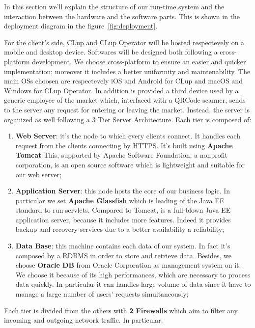 In this section we'll explain the structure of our run-time system and the interaction between the hardware and the software parts. This is shown in the deployment diagram in the figure~\ref{fig:deployment}. 

For the client's side, CLup and CLup Operator will be hosted respectevely on a mobile and desktop device. Softwares will be designed both following a cross-platform development. 
We choose cross-platform to ensure an easier and quicker implementation; moreover it includes a better uniformity and maintenability.   
The main OSs choosen are respectevely iOS and Android for CLup and macOS and Windows for CLup Operator.
In addition is provided a third device used by a generic employee of the market which, interfaced with a QRCode scanner, sends to the server any request for entering or leaving  the market.
Instead, the server is organized as well following a 3 Tier Server Architecture. Each tier is composed of:

\begin{enumerate}
\item \textbf{Web Server}: it's the node to which every clients connect. It handles each request from the clients connecting by HTTPS. It's built using \textbf{Apache Tomcat} %
This, supported by Apache Software Foundation, a nonprofit corporation, is an open source software which is lightweight and suitable for our web server;
\item \textbf{Application Server}: this node hosts the core of our business logic. In particular we set \textbf{Apache Glassfish} which is leading of the Java EE standard to run servlets. Compared to Tomcat, is a full-blown Java EE application server, because it includes more features. Indeed it provides backup and recovery services due to a better availability a reliability;

\item \textbf{Data Base}: this machine contains each data of our system. In fact it's composed by a RDBMS in order to store and retrieve data. Besides, we choose \textbf{Oracle DB} from Oracle Corporation as management system on it. We choose it because of its high performances, which are necessary to process data quickly. In particular it can handles large volume of data since it have to manage a large number of users' requests simultaneously;
\end{enumerate}


Each tier is divided from the others with \textbf{2 Firewalls} which aim to filter any incoming and outgoing network traffic.
In particular:

